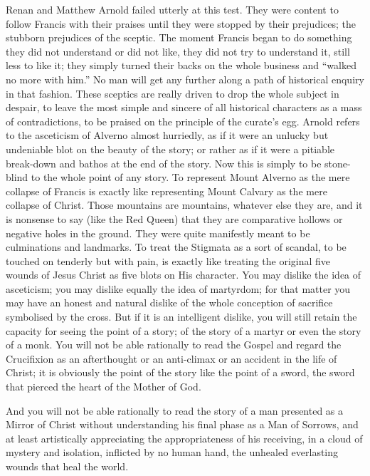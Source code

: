 \documentclass{book}
\begin{document}
Renan and Matthew Arnold failed utterly at this test. They were content to follow Francis with their praises until they were stopped by their prejudices; the stubborn prejudices of the sceptic. The moment Francis began to do something they did not understand or did not like, they did not try to understand it, still less to like it; they simply turned their backs on the whole business and “walked no more with him.” No man will get any further along a path of historical enquiry in that fashion. These sceptics are really driven to drop the whole subject in despair, to leave the most simple and sincere of all historical characters as a mass of contradictions, to be praised on the principle of the curate’s egg. Arnold refers to the asceticism of Alverno almost hurriedly, as if it were an unlucky but undeniable blot on the beauty of the story; or rather as if it were a pitiable break-down and bathos at the end of the story. Now this is simply to be stone-blind to the whole point of any story. To represent Mount Alverno as the mere collapse of Francis is exactly like representing Mount Calvary as the mere collapse of Christ. Those mountains are mountains, whatever else they are, and it is nonsense to say (like the Red Queen) that they are comparative hollows or negative holes in the ground. They were quite manifestly meant to be culminations and landmarks. To treat the Stigmata as a sort of scandal, to be touched on tenderly but with pain, is exactly like treating the original five wounds of Jesus Christ as five blots on His character. You may dislike the idea of asceticism; you may dislike equally the idea of martyrdom; for that matter you may have an honest and natural dislike of the whole conception of sacrifice symbolised by the cross. But if it is an intelligent dislike, you will still retain the capacity for seeing the point of a story; of the story of a martyr or even the story of a monk. You will not be able rationally to read the Gospel and regard the Crucifixion as an afterthought or an anti-climax or an accident in the life of Christ; it is obviously the point of the story like the point of a sword, the sword that pierced the heart of the Mother of God.

And you will not be able rationally to read the story of a man presented as a Mirror of Christ without understanding his final phase as a Man of Sorrows, and at least artistically appreciating the appropriateness of his receiving, in a cloud of mystery and isolation, inflicted by no human hand, the unhealed everlasting wounds that heal the world.
\end{document}
